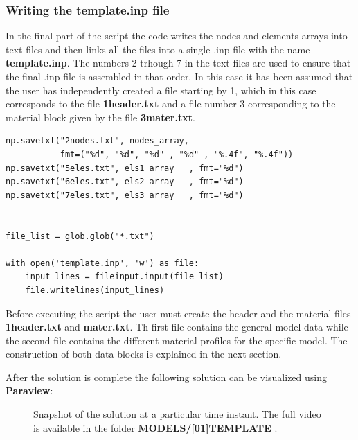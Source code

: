 \documentclass[12pt,letterpaper]{article}
\begin{document}
\subsubsection*{Writing the template.inp file}
In the final part of the script the code writes the nodes and elements arrays into text files and then links all the files into a single .inp file with the name {\bf template.inp}. The numbers 2 trhough 7 in the text files are used to ensure that the final .inp file is assembled in that order. In this case it has been assumed that the user has independently created a file starting by 1, which in this case corresponds to the file {\bf 1header.txt} and a file number 3 corresponding to the material block given by the file {\bf 3mater.txt}.

\begin{verbatim}
np.savetxt("2nodes.txt", nodes_array,
           fmt=("%d", "%d", "%d" , "%d" , "%.4f", "%.4f"))
np.savetxt("5eles.txt", els1_array   , fmt="%d")
np.savetxt("6eles.txt", els2_array   , fmt="%d")
np.savetxt("7eles.txt", els3_array   , fmt="%d")


file_list = glob.glob("*.txt")

with open('template.inp', 'w') as file:
    input_lines = fileinput.input(file_list)
    file.writelines(input_lines)
\end{verbatim}

Before executing the script the user must create the header and the material files {\bf 1header.txt} and {\bf mater.txt}. Th first file contains the general model data while the second file contains the different material profiles for the specific model. The construction of both data blocks is explained in the next section.

After the solution is complete the following solution can be visualized using {\bf Paraview}:


\begin{figure}[H]
\centering
{}
\caption{Snapshot of the solution at a particular time instant. The full video is available in the folder {\bf MODELS/[01]TEMPLATE }.} 
\label{fig:malla}
\end{figure}
 
\end{document}
